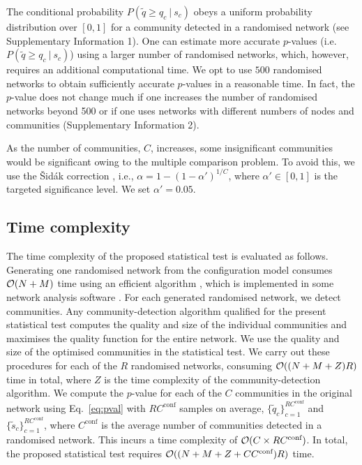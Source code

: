 \documentclass[fleqn,10pt]{wlscirep}
\newcommand\given[1][]{\:#1\vert\:}
\def\conf{{\text{conf}}}
\begin{document}
The conditional probability $P(\tilde q \geq q_c \given s_c)$ obeys a uniform probability distribution over $[0,1]$ for a community detected in a randomised network (see Supplementary Information 1).
One can estimate more accurate $p$-values (i.e. $P(\tilde q \geq q_c \given s_c)$) using a larger number of randomised networks, which, however, requires an additional computational time.
We opt to use $500$ randomised networks to obtain sufficiently accurate $p$-values in a reasonable time.
In fact, the $p$-value does not change much if one increases the number of randomised networks beyond 500 or if one uses networks with different numbers of nodes and communities (Supplementary Information 2).

As the number of communities, $C$, increases, some insignificant communities would be significant owing to the multiple comparison problem.
To avoid this, we use the {\v{S}}id{\'{a}}k correction \cite{Sidak1967}, i.e.,  
$\alpha = 1-(1-\alpha')^{1/C}$, where $\alpha' \in [0,1]$ is the targeted significance level.
We set $\alpha' = 0.05$.


\subsection{Time complexity}
\label{sec:timecomplexity}
The time complexity of the proposed statistical test is evaluated as follows.
Generating one randomised network from the configuration model consumes ${\cal O}(N + M)$ time using an efficient algorithm \cite{Miller2011}, which is implemented in some network analysis software \cite{Networkit,Networkx}.
For each generated randomised network, we detect communities. 
Any community-detection algorithm qualified for the present statistical test computes the quality and size of the individual communities and maximises the quality function for the entire network.
We use the quality and size of the optimised communities in the statistical test.
We carry out these procedures for each of the $R$ randomised networks, consuming ${\cal O}((N+M+Z)R)$ time in total, where $Z$ is the time complexity of the community-detection algorithm.
We compute the $p$-value for each of the $C$ communities in the original network using Eq.~\eqref{eq:pval} with $RC^{\conf}$ samples on average, $\{ \tilde q_{c} \}_{c = 1} ^{RC^\conf}$ and $\{ \tilde s_{c} \}_{c=1} ^{RC^\conf}$, where $C^{\conf}$ is the average number of communities detected in a randomised network.
This incurs a time complexity of ${\cal O}(C\times RC^{\conf})$.  
In total, the proposed statistical test requires ${\cal O}((N + M + Z + CC^{\conf})R)$ time.
\end{document}
